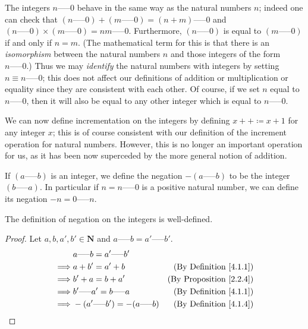 \begin{note}
The integers \(n \text{-----} 0\) behave in the same way as the natural numbers \(n\);
indeed one can check that \((n \text{-----} 0) + (m \text{-----} 0) = (n + m) \text{-----} 0\) and \((n \text{-----} 0) \times (m \text{-----} 0) = nm \text{-----} 0\).
Furthermore, \((n \text{-----} 0)\) is equal to \((m \text{-----} 0)\) if and only if \(n = m\).
(The mathematical term for this is that there is an \emph{isomorphism} between the natural numbers \(n\) and those integers of the form \(n \text{-----} 0\).)
Thus we may \emph{identify} the natural numbers with integers by setting \(n \equiv n \text{-----} 0\);
this does not affect our definitions of addition or multiplication or equality since they are consistent with each other.
Of course, if we set \(n\) equal to \(n \text{-----} 0\), then it will also be equal to any other integer which is equal to \(n \text{-----} 0\).
\end{note}

\begin{note}
We can now define incrementation on the integers by defining \(x++ \coloneqq x + 1\) for any integer \(x\);
this is of course consistent with our definition of the increment operation for natural numbers.
However, this is no longer an important operation for us, as it has been now superceded by the more general notion of addition.
\end{note}

\begin{definition}\label{4.1.4}
If \((a \text{-----} b)\) is an integer, we define the negation \(-(a \text{-----} b)\) to be the integer \((b \text{-----} a)\).
In particular if \(n = n \text{-----} 0\) is a positive natural number, we can define its negation \(-n = 0 \text{-----} n\).
\end{definition}

\begin{additional corollary}\label{ac 4.1.2}
The definition of negation on the integers is well-defined.
\end{additional corollary}

\begin{proof}
Let \(a, b, a', b' \in \mathbf{N}\) and \(a \text{-----} b = a' \text{-----} b'\).
\begin{align*}
& a \text{-----} b = a' \text{-----} b' \\
\implies & a + b' = a' + b & \text{(By Definition \ref{4.1.1})} \\
\implies & b' + a = b + a' & \text{(By Proposition \ref{2.2.4})} \\
\implies & b' \text{-----} a' = b \text{-----} a & \text{(By Definition \ref{4.1.1})} \\
\implies & -(a' \text{-----} b') = -(a \text{-----} b) & \text{(By Definition \ref{4.1.4})} \\
\end{align*}
\end{proof}

